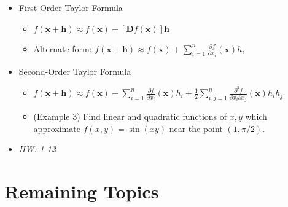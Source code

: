 \documentclass[11pt]{article}
\theoremstyle{plain}
\theoremstyle{definition}
\theoremstyle{remark}
\newcommand{\vect}[1]{\mathbf{#1}}
\newcommand{\<}{\langle}
\renewcommand{\>}{\rangle}
\newcommand{\p}{\partial}
\begin{document}
\begin{itemize}
  \item First-Order Taylor Formula
    \begin{itemize}
      \item
        \(
          f(\vect x + \vect h)
            \approx
          f(\vect x) + [\vect Df(\vect x)]\vect h
        \)
      \item Alternate form:
        \(
          f(\vect x + \vect h)
            \approx
          f(\vect x)
            +
          \sum_{i=1}^{n}\frac{\p f}{\p x_i}(\vect x)h_i
        \)
    \end{itemize}
  \item Second-Order Taylor Formula
    \begin{itemize}
      \item
        \(
          f(\vect x + \vect h)
            \approx
          f(\vect x)
            +
          \sum_{i=1}^{n}\frac{\p f}{\p x_i}(\vect x)h_i
            +
          \frac{1}{2}
          \sum_{i,j=1}^{n}\frac{\p^2 f}{\p x_i\p x_j}(\vect x)h_ih_j
        \)
      \item
        (Example 3) Find linear and quadratic functions of \(x,y\) which
        approximate \(f(x,y)=\sin(xy)\) near the point \((1,\pi/2)\).
    \end{itemize}
  \item\textit{
    HW: 1-12
  }
\end{itemize}


\section*{Remaining Topics}
\end{document}
